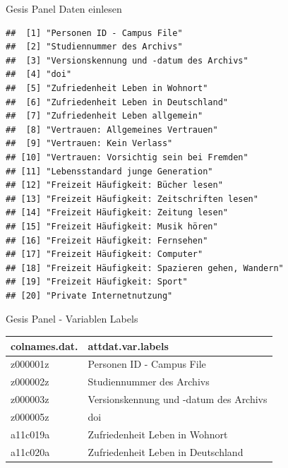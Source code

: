 \documentclass[ignorenonframetext,]{beamer}
\newenvironment{Shaded}{}{}
\newcommand{\KeywordTok}[1]{\textcolor[rgb]{0.00,0.44,0.13}{\textbf{{#1}}}}
\newcommand{\StringTok}[1]{\textcolor[rgb]{0.25,0.44,0.63}{{#1}}}
\newcommand{\NormalTok}[1]{{#1}}
\begin{document}
\begin{frame}[fragile]{Gesis Panel Daten einlesen}

\begin{Shaded}
\end{Shaded}

\begin{verbatim}
##  [1] "Personen ID - Campus File"                    
##  [2] "Studiennummer des Archivs"                    
##  [3] "Versionskennung und -datum des Archivs"       
##  [4] "doi"                                          
##  [5] "Zufriedenheit Leben in Wohnort"               
##  [6] "Zufriedenheit Leben in Deutschland"           
##  [7] "Zufriedenheit Leben allgemein"                
##  [8] "Vertrauen: Allgemeines Vertrauen"             
##  [9] "Vertrauen: Kein Verlass"                      
## [10] "Vertrauen: Vorsichtig sein bei Fremden"       
## [11] "Lebensstandard junge Generation"              
## [12] "Freizeit Häufigkeit: Bücher lesen"            
## [13] "Freizeit Häufigkeit: Zeitschriften lesen"     
## [14] "Freizeit Häufigkeit: Zeitung lesen"           
## [15] "Freizeit Häufigkeit: Musik hören"             
## [16] "Freizeit Häufigkeit: Fernsehen"               
## [17] "Freizeit Häufigkeit: Computer"                
## [18] "Freizeit Häufigkeit: Spazieren gehen, Wandern"
## [19] "Freizeit Häufigkeit: Sport"                   
## [20] "Private Internetnutzung"
\end{verbatim}

\end{frame}

\begin{frame}{Gesis Panel - Variablen Labels}

\begin{longtable}[]{@{}ll@{}}
\toprule
colnames.dat. & attdat.var.labels\tabularnewline
\midrule
\endhead
z000001z & Personen ID - Campus File\tabularnewline
z000002z & Studiennummer des Archivs\tabularnewline
z000003z & Versionskennung und -datum des Archivs\tabularnewline
z000005z & doi\tabularnewline
a11c019a & Zufriedenheit Leben in Wohnort\tabularnewline
a11c020a & Zufriedenheit Leben in Deutschland\tabularnewline
\bottomrule
\end{longtable}

\end{frame}
\end{document}
